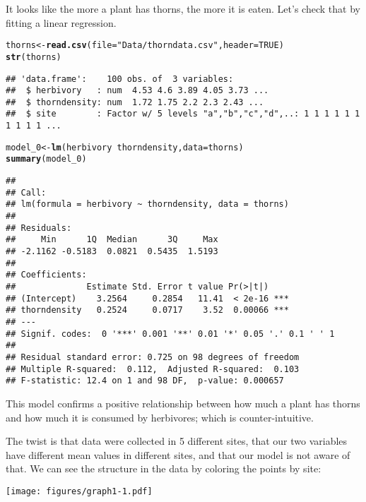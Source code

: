 \documentclass[12pt,a4paper]{scrartcl}\usepackage[]{graphicx}\usepackage[]{color}
\makeatletter
\newcommand{\hlnum}[1]{\textcolor[rgb]{0.686,0.059,0.569}{#1}}%
\newcommand{\hlstr}[1]{\textcolor[rgb]{0.192,0.494,0.8}{#1}}%
\newcommand{\hlopt}[1]{\textcolor[rgb]{0,0,0}{#1}}%
\newcommand{\hlstd}[1]{\textcolor[rgb]{0.345,0.345,0.345}{#1}}%
\newcommand{\hlkwb}[1]{\textcolor[rgb]{0.69,0.353,0.396}{#1}}%
\newcommand{\hlkwc}[1]{\textcolor[rgb]{0.333,0.667,0.333}{#1}}%
\newcommand{\hlkwd}[1]{\textcolor[rgb]{0.737,0.353,0.396}{\textbf{#1}}}%
\newenvironment{kframe}{%
 \def\at@end@of@kframe{}%
 \ifinner\ifhmode%
  \def\at@end@of@kframe{\end{minipage}}%
  \begin{minipage}{\columnwidth}%
 \fi\fi%
 \def\FrameCommand##1{\hskip\@totalleftmargin \hskip-\fboxsep
 \colorbox{shadecolor}{##1}\hskip-\fboxsep
     \hskip-\linewidth \hskip-\@totalleftmargin \hskip\columnwidth}%
 \MakeFramed {\advance\hsize-\width
   \@totalleftmargin\z@ \linewidth\hsize
   \@setminipage}}%
 {\par\unskip\endMakeFramed%
 \at@end@of@kframe}
\newenvironment{knitrout}{}{} %
\makeatother
\begin{document}
It looks like the more a plant has thorns, the more it is eaten. Let's check that by fitting a linear regression.

\begin{knitrout}
\color{fgcolor}\begin{kframe}
\begin{alltt}
\hlstd{thorns} \hlkwb{<-} \hlkwd{read.csv}\hlstd{(}\hlkwc{file} \hlstd{=} \hlstr{"Data/thorndata.csv"}\hlstd{,} \hlkwc{header}\hlstd{=}\hlnum{TRUE}\hlstd{)}
\hlkwd{str}\hlstd{(thorns)}
\end{alltt}
\begin{verbatim}
## 'data.frame':	100 obs. of  3 variables:
##  $ herbivory   : num  4.53 4.6 3.89 4.05 3.73 ...
##  $ thorndensity: num  1.72 1.75 2.2 2.3 2.43 ...
##  $ site        : Factor w/ 5 levels "a","b","c","d",..: 1 1 1 1 1 1 1 1 1 1 ...
\end{verbatim}
\begin{alltt}
\hlstd{model_0} \hlkwb{<-} \hlkwd{lm}\hlstd{(herbivory} \hlopt{~} \hlstd{thorndensity,} \hlkwc{data} \hlstd{= thorns)}
\hlkwd{summary}\hlstd{(model_0)}
\end{alltt}
\begin{verbatim}
## 
## Call:
## lm(formula = herbivory ~ thorndensity, data = thorns)
## 
## Residuals:
##     Min      1Q  Median      3Q     Max 
## -2.1162 -0.5183  0.0821  0.5435  1.5193 
## 
## Coefficients:
##              Estimate Std. Error t value Pr(>|t|)    
## (Intercept)    3.2564     0.2854   11.41  < 2e-16 ***
## thorndensity   0.2524     0.0717    3.52  0.00066 ***
## ---
## Signif. codes:  0 '***' 0.001 '**' 0.01 '*' 0.05 '.' 0.1 ' ' 1
## 
## Residual standard error: 0.725 on 98 degrees of freedom
## Multiple R-squared:  0.112,	Adjusted R-squared:  0.103 
## F-statistic: 12.4 on 1 and 98 DF,  p-value: 0.000657
\end{verbatim}
\end{kframe}
\end{knitrout}
This model confirms a positive relationship between how much a plant has thorns and how much it is consumed by herbivores; which is counter-intuitive.

The twist is that data were collected in 5 different sites, that our two variables have different mean values in different sites, and that our model is not aware of that. 
We can see the structure in the data by coloring the points by site:
\begin{center}
  \texttt{[image: figures/graph1-1.pdf]}
\end{center}
\end{document}

